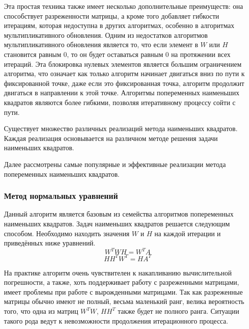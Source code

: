 Эта простая техника также имеет несколько дополнительные преимуществ:
она способствует разреженности матрицы, а кроме того добавляет гибкости итерациям,
которая недоступна в других алгоритмах, особенно в алгоритмах мультипликативного обновления.
Одним из недостатков алгоритмов мультипликативного обновления является то,
что если элемент в $W$ или $H$ становится равным $0$,
то он будет оставаться равным $0$ на протяжении всех итераций.
Эта блокировка нулевых элементов является большим ограничением алгоритма,
что означает как только алгоритм начинает двигаться вниз по пути к фиксированной точке,
даже если это  фиксированная точка, алгоритм продолжит двигаться в направлении к этой точке.
Алгоритмы попеременных наименьших квадратов являются более гибкими,
позволяя итеративному процессу сойти с  пути.




\newpage




Существует множество различных реализаций метода наименьших квадратов.
Каждая реализация основывается на различном методе решения задачи наименьших квадратов.

Далее рассмотрены самые популярные и эффективные реализации метода попеременных наименьших квадратов.

\subsubsection{Метод нормальных уравнений}

Данный алгоритм является базовым из семейства алгоритмов попеременных наименьших квадратов.
Задач наименьших квадратов решается следующим способом.
Необходимо находить значения $W$ и $H$ на каждой итерации и приведённых ниже уравнений.
\begin{equation}
  W^T W H = W^T A
\end{equation}
\begin{equation}
  H H^T W^T = H A^T
\end{equation}


На практике алгоритм очень чувствителен к накапливанию вычислительной погрешности,
а также, хоть поддерживает работу с разреженными матрицами, имеет проблемы при работе с вырожденными матрицами.
Так как разреженные матрицы обычно имеют не полный, весьма маленький ранг,
велика вероятность того, что одна из матриц $W^TW$, $HH^T$ также будет не полного ранга.
Ситуации такого рода ведут к невозможности продолжения итерационного процесса.

